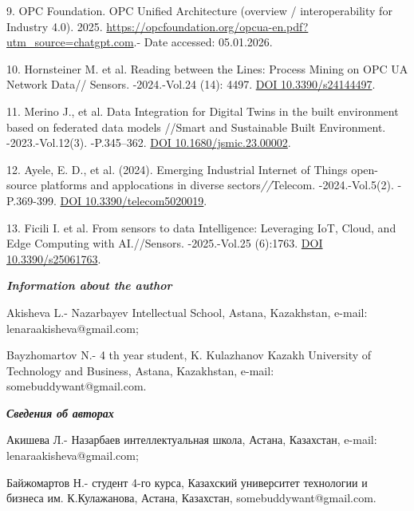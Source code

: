 \begin{refs}
9. OPC Foundation. OPC Unified Architecture (overview / interoperability
for Industry 4.0).
2025. \url{https://opcfoundation.org/opcua-en.pdf?utm_source=chatgpt.com}.-
Date accessed: 05.01.2026.

10. Hornsteiner M. et al. Reading between the Lines: Process Mining on
OPC UA Network Data// Sensors. -2024.-Vol.24 (14): 4497.
\href{https://doi.org/10.3390/s24144497}{DOI 10.3390/s24144497}.

11. Merino J., et al. Data Integration for Digital Twins in the built
environment based on federated data models //Smart and Sustainable Built
Environment. -2023.-Vol.12(3). -P.345--362.
\href{https://doi.org/10.1680/jsmic.23.00002}{DOI
10.1680/jsmic.23.00002}.

12. Ayele, E. D., et al. (2024). Emerging Industrial Internet of Things
open-source platforms and applocations in diverse
sectors\emph{//}Telecom. -2024.-Vol.5(2). -P.369-399.
\href{https://doi.org/10.3390/telecom5020019}{DOI
10.3390/telecom5020019}.

13. Ficili I. et al. From sensors to data Intelligence: Leveraging IoT,
Cloud, and Edge Computing with AI.//Sensors. -2025.-Vol.25 (6):1763.
\href{https://doi.org/10.3390/s25061763}{DOI 10.3390/s25061763}.
\end{refs}

\begin{info}
\hspace{1em}\emph{{\bfseries Information about the author}}

Akisheva L.- Nazarbayev Intellectual School, Astana, Kazakhstan,
e-mail: lenaraakisheva@gmail.com;

Bayzhomartov N.- 4 th year student, K. Kulazhanov Kazakh University of
Technology and Business, Astana, Kazakhstan, e-mail:
somebuddywant@gmail.com.

\hspace{1em}\emph{{\bfseries Сведения об авторах}}

Акишева Л.- Назарбаев интеллектуальная школа, Астана, Казахстан,
e-mail: lenaraakisheva@gmail.com;

Байжомартов Н.- студент 4-го курса, Казахский университет технологии и
бизнеса им. К.Кулажанова, Астана, Казахстан, somebuddywant@gmail.com.
\end{info}

